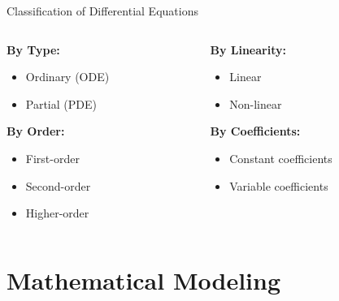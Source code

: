 \documentclass[10pt,aspectratio=169]{beamer}
\begin{document}
\begin{frame}{Classification of Differential Equations}
    \begin{columns}
        \begin{column}{0.5\textwidth}
            \textbf{By Type:}
            \begin{itemize}
                \item Ordinary (ODE)
                \item Partial (PDE)
            \end{itemize}
            
            \textbf{By Order:}
            \begin{itemize}
                \item First-order
                \item Second-order
                \item Higher-order
            \end{itemize}
        \end{column}
        \begin{column}{0.5\textwidth}
            \textbf{By Linearity:}
            \begin{itemize}
                \item Linear
                \item Non-linear
            \end{itemize}
            
            \textbf{By Coefficients:}
            \begin{itemize}
                \item Constant coefficients
                \item Variable coefficients
            \end{itemize}
        \end{column}
    \end{columns}
\end{frame}

\section{Mathematical Modeling}
\end{document}
